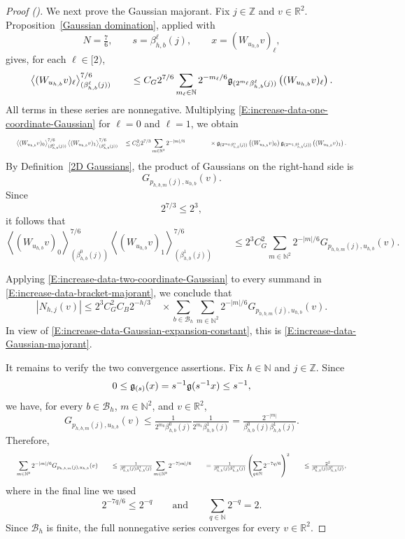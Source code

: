 \documentclass[12pt,reqno]{amsart}
\newcommand{\auto}{{({\tiny\faCar})}}
\theoremstyle{plain}
\numberwithin{equation}{section}
\theoremstyle{remark}
\begin{document}
\begin{proof}[Proof \auto]
We next prove the Gaussian majorant. Fix \(j\in\mathbb Z\) and
\(v\in\mathbb R^2\). Proposition~\ref{Gaussian domination}, applied
with
\[
N=\tfrac76,
\qquad
s=\beta_{h,b}^\ell(j),
\qquad
x=(W_{u_{h,b}}v)_\ell,
\]
gives, for each \(\ell\in[2)\),
\begin{equation}
    \label{E:increase-data-one-coordinate-Gaussian}
    \left\langle (W_{u_{h,b}}v)_\ell \right\rangle_{(\beta_{h,b}^\ell(j))}^{7/6} \qquad\leq C_G2^{7/6} \sum_{m_\ell\in\mathbb N} 2^{-m_\ell/6} \mathfrak{g}_{(2^{m_\ell}\beta_{h,b}^\ell(j))} \left((W_{u_{h,b}}v)_\ell\right).
\end{equation}
All terms in these series are nonnegative. Multiplying
\eqref{E:increase-data-one-coordinate-Gaussian} for
\(\ell=0\) and \(\ell=1\), we obtain
\[
\resizebox{0.98\textwidth}{!}{$\displaystyle \left\langle (W_{u_{h,b}}v)_0 \right\rangle_{(\beta_{h,b}^0(j))}^{7/6} \left\langle (W_{u_{h,b}}v)_1 \right\rangle_{(\beta_{h,b}^1(j))}^{7/6} \quad\leq C_G^2 2^{7/3} \sum_{m\in\mathbb N^2} 2^{-|m|/6} \qquad\qquad\times \g_{(2^{m_0}\beta_{h,b}^0(j))} \left((W_{u_{h,b}}v)_0\right) \g_{(2^{m_1}\beta_{h,b}^1(j))} \left((W_{u_{h,b}}v)_1\right).$}
\]
By Definition~\ref{2D Gaussians}, the product of Gaussians on the
right-hand side is
\[
G_{p_{h,b,m}(j),u_{h,b}}(v).
\]
Since
\[
2^{7/3}\leq2^3,
\]
it follows that
\begin{equation}
    \label{E:increase-data-two-coordinate-Gaussian}
    \left\langle (W_{u_{h,b}}v)_0 \right\rangle_{(\beta_{h,b}^0(j))}^{7/6} \left\langle (W_{u_{h,b}}v)_1 \right\rangle_{(\beta_{h,b}^1(j))}^{7/6} \qquad\leq 2^3C_G^2 \sum_{m\in\mathbb N^2} 2^{-|m|/6} G_{p_{h,b,m}(j),u_{h,b}}(v).
\end{equation}

Applying \eqref{E:increase-data-two-coordinate-Gaussian} to every
summand in
\eqref{E:increase-data-bracket-majorant}, we conclude that
\[
|N_{h,j}(v)| \leq 2^3C_G^2C_B 2^{-h/3} \quad\times \sum_{b\in\mathcal B_h} \sum_{m\in\mathbb N^2} 2^{-|m|/6} G_{p_{h,b,m}(j),u_{h,b}}(v).
\]
In view of
\eqref{E:increase-data-Gaussian-expansion-constant}, this is
\eqref{E:increase-data-Gaussian-majorant}.

It remains to verify the two convergence assertions. Fix
\(h\in\mathbb N\) and \(j\in\mathbb Z\). Since
\[
0\leq\mathfrak{g}_{(s)}(x)
=
s^{-1}\mathfrak{g}(s^{-1}x)
\leq s^{-1},
\]
we have, for every \(b\in\mathcal B_h\), \(m\in\mathbb N^2\),
and \(v\in\mathbb R^2\),
\[
G_{p_{h,b,m}(j),u_{h,b}}(v) \leq \tfrac{1}{ 2^{m_0}\beta_{h,b}^0(j) } \tfrac{1}{ 2^{m_1}\beta_{h,b}^1(j) } = \tfrac{2^{-|m|}}{ \beta_{h,b}^0(j)\beta_{h,b}^1(j) }.
\]
Therefore,
\[
\resizebox{0.98\textwidth}{!}{$\displaystyle \sum_{m\in\mathbb N^2} 2^{-|m|/6} G_{p_{h,b,m}(j),u_{h,b}}(v) \qquad\leq \tfrac{1}{ \beta_{h,b}^0(j)\beta_{h,b}^1(j) } \sum_{m\in\mathbb N^2} 2^{-7|m|/6} \qquad= \tfrac{1}{ \beta_{h,b}^0(j)\beta_{h,b}^1(j) } \left( \sum_{q\in\mathbb N}2^{-7q/6} \right)^2 \qquad\leq \tfrac{2^2}{ \beta_{h,b}^0(j)\beta_{h,b}^1(j) },$}
\]
where in the final line we used
\[
2^{-7q/6}\leq2^{-q}
\qquad\text{and}\qquad
\sum_{q\in\mathbb N}2^{-q}=2.
\]
Since \(\mathcal B_h\) is finite, the full nonnegative series
converges for every \(v\in\mathbb R^2\).


\end{proof}
\end{document}
